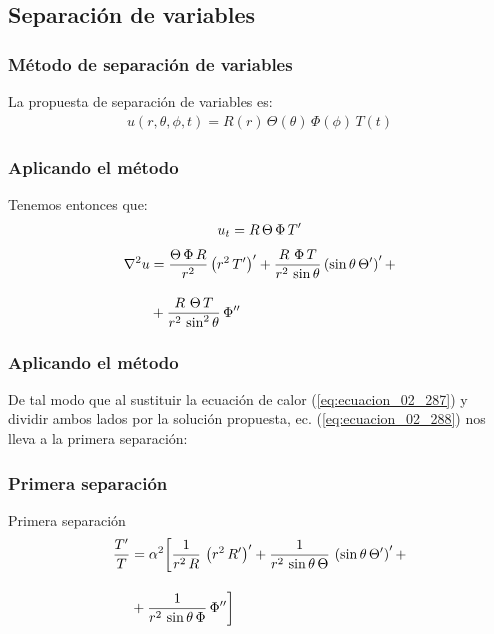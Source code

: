 \documentclass[12pt]{beamer}
\begin{document}
\subsection{Separación de variables}
\begin{frame}
\frametitle{Método de separación de variables}
La propuesta de separación de variables es:
\begin{align}
u(r, \theta, \phi, t) = R(r) \, \Theta (\theta) \, \Phi(\phi) \, T(t)
\label{eq:ecuacion_02_288}
\end{align}
\end{frame}
\begin{frame}
\frametitle{Aplicando el método}
Tenemos entonces que:
\begin{align}
u_{t} = R \, \Theta \, \Phi \, {T}^{\prime} \label{eq:ecuacion_02_289}
\end{align}
\begin{align}
\begin{aligned}
\laplacian{u} &= \dfrac{\Theta \, \Phi \, R}{r^{2}} \left( r^{2} \, \pderivada{T} \right)^{\prime} + \dfrac{R \, \, \Phi \, T}{r^{2} \, \sin \theta} \left( \sin \theta \, \pderivada{\Theta} \right)^{\prime} + \\[1em]
&+ \dfrac{R \, \, \Theta \, T}{r^{2} \, \sin^{2} \theta} \, \sderivada{\Phi}
\end{aligned}
\label{eq:ecuacion_02_290}
\end{align}
\end{frame}
\begin{frame}
\frametitle{Aplicando el método}
De tal modo que al sustituir la ecuación de calor (\ref{eq:ecuacion_02_287}) y dividir ambos lados por la solución propuesta, ec. (\ref{eq:ecuacion_02_288}) nos lleva a la primera separación:
\end{frame}
\begin{frame}
\frametitle{Primera separación}
Primera separación
\begin{align}
\begin{aligned}
\dfrac{{T}^{\prime}}{T} &= \alpha^{2} \bigg[ \dfrac{1}{r^{2} \, R} \, \left( r^{2} \, {R}^{\prime} \right)^{\prime} + \dfrac{1}{r^{2} \, \sin \theta \, \Theta} \, \left( \sin \theta \, {\Theta}^{\prime} \right)^{\prime} + \\[1em]
&+ \dfrac{1}{r^{2} \, \sin \theta \, \Phi} \, {\Phi}^{\prime \prime} \bigg]
\end{aligned}
\label{eq:}
\end{align}
\end{frame}
\end{document}
